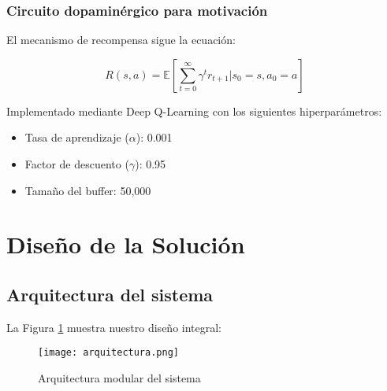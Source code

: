\documentclass[journal]{new-aiaa}
\begin{document}
\subsubsection{Circuito dopaminérgico para motivación}
El mecanismo de recompensa sigue la ecuación:

\begin{equation}
R(s,a) = \mathbb{E} \left[ \sum_{t=0}^{\infty} \gamma^t r_{t+1} | s_0 = s, a_0 = a \right]
\end{equation}

Implementado mediante Deep Q-Learning con los siguientes hiperparámetros:
\begin{itemize}
\item Tasa de aprendizaje ($\alpha$): 0.001
\item Factor de descuento ($\gamma$): 0.95
\item Tamaño del buffer: 50,000
\end{itemize}

\section{Diseño de la Solución}
\subsection{Arquitectura del sistema}
La Figura \ref{fig:arquitectura} muestra nuestro diseño integral:

\begin{figure}[h]
\centering
\texttt{[image: arquitectura.png]}
\caption{Arquitectura modular del sistema}
\label{fig:arquitectura}
\end{figure}
\end{document}
